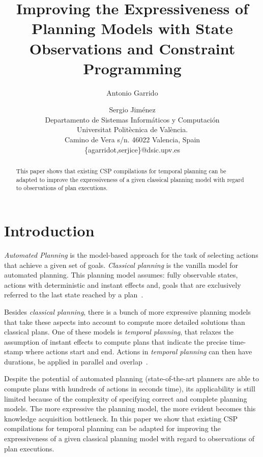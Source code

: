 \documentclass[letterpaper]{article} %
\begin{document}
\title{Improving the Expressiveness of Planning Models with State Observations and Constraint Programming}

\author{Antonio Garrido\and Sergio Jim\'enez\\
{\small Departamento de Sistemas Inform\'aticos y Computaci\'on}\\
{\small Universitat Polit\`ecnica de Val\`encia.}\\
{\small Camino de Vera s/n. 46022 Valencia, Spain}\\
{\small \{agarridot,serjice\}@dsic.upv.es}}



\maketitle
\begin{abstract}
This paper shows that existing CSP compilations for temporal planning can be adapted to improve the expressiveness of a given classical planning model with regard to observations of plan executions.
\end{abstract}


\section{Introduction}
\label{sec:introduction}
{\em Automated Planning} is the model-based approach for the task of selecting actions that achieve a given set of goals. {\em Classical planning} is the vanilla model for automated planning. This planning model assumes: fully observable states, actions with deterministic and instant effects and, goals that are exclusively referred to the last state reached by a plan~\cite{geffner2013concise}.

Besides {\em classical planning}, there is a bunch of more expressive planning models that take these aspects into account to compute more detailed solutions than classical plans. One of these models is {\em temporal planning}, that relaxes the assumption of instant effects to compute plans that indicate the precise time-stamp where actions start and end. Actions in {\em temporal planning} can then have durations, be applied in parallel and overlap~\cite{ghallab2004automated}.

Despite the potential of automated planning (state-of-the-art planners are able to compute plans with hundreds of actions in seconds time), its applicability is still limited because of the complexity of specifying correct and complete planning models. The more expressive the planning model, the more evident becomes this knowledge acquisition bottleneck. In this paper we show that existing CSP compilations for temporal planning can be adapted for improving the expressiveness of a given classical planning model with regard to observations of plan executions.
\end{document}

